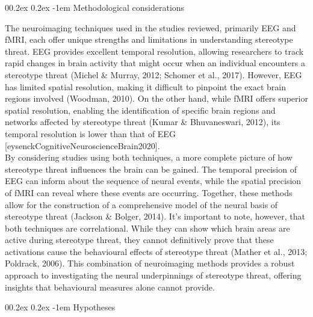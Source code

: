 \documentclass[
  stu, a4paper,floatsintext]{apa7}
\makeatletter
\let\oldparagraph\paragraph
\renewcommand{\paragraph}[1]{\oldparagraph{#1}\mbox{}}
\renewcommand{\paragraph}{\@startsection{paragraph}{4}{\parindent}%
  {0\baselineskip \@plus 0.2ex \@minus 0.2ex}%
  {-1em}%
  {\normalfont\normalsize\bfseries\itshape\typesectitle}}
\renewcommand{\paragraph}{\@startsection{paragraph}{4}{\parindent}%
  {0\baselineskip \@plus 0.2ex \@minus 0.2ex}%
  {-1em}%
  {\normalfont\normalsize\bfseries\typesectitle}}
\makeatother
\begin{document}
\paragraph{Methodological considerations}\label{methodological-considerations}

The neuroimaging techniques used in the studies reviewed, primarily EEG and fMRI, each offer unique strengths and limitations in understanding stereotype threat.
EEG provides excellent temporal resolution, allowing researchers to track rapid changes in brain activity that might occur when an individual encounters a stereotype threat (Michel \& Murray, 2012; Schomer et al., 2017).
However, EEG has limited spatial resolution, making it difficult to pinpoint the exact brain regions involved (Woodman, 2010).
On the other hand, while fMRI offers superior spatial resolution, enabling the identification of specific brain regions and networks affected by stereotype threat (Kumar \& Bhuvaneswari, 2012), its temporal resolution is lower than that of EEG {[}eysenckCognitiveNeuroscienceBrain2020{]}.\\
By considering studies using both techniques, a more complete picture of how stereotype threat influences the brain can be gained. The temporal precision of EEG can inform about the sequence of neural events, while the spatial precision of fMRI can reveal where these events are occurring. Together, these methods allow for the construction of a comprehensive model of the neural basis of stereotype threat (Jackson \& Bolger, 2014).
It's important to note, however, that both techniques are correlational.
While they can show which brain areas are active during stereotype threat, they cannot definitively prove that these activations cause the behavioural effects of stereotype threat (Mather et al., 2013; Poldrack, 2006).
This combination of neuroimaging methods provides a robust approach to investigating the neural underpinnings of stereotype threat, offering insights that behavioural measures alone cannot provide.

\paragraph{Hypotheses}\label{hypotheses}
\end{document}
